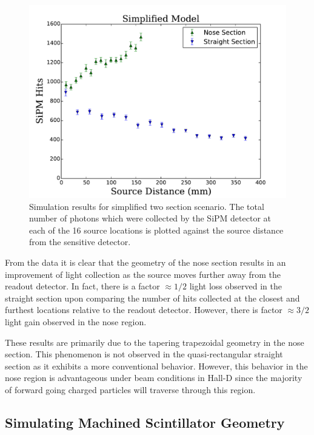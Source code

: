 	\begin{figure}[!htb]
	\centering
	\includegraphics[width=1.0\columnwidth]{simulation/figs/sim_results_v5}
	\caption{Simulation results for simplified two section scenario. The total number of photons which were collected by the SiPM detector at each of the 16 source locations is plotted against the source distance from the sensitive detector.}
	\label{fig:sim_results}
	\end{figure}

From the data it is clear that the geometry of the nose section results in an improvement of light collection as the source moves further away from the readout detector.  In fact, there is a factor $\approx 1/2$ light loss observed in the straight section upon comparing the number of hits collected at the closest and furthest locations relative to the readout detector.  However, there is factor $\approx 3/2$ light gain observed in the nose region.

These results are primarily due to the tapering trapezoidal geometry in the nose section.  This phenomenon is not observed in the quasi-rectangular straight section as it exhibits a more conventional behavior. However, this behavior in the nose region is advantageous under beam conditions in Hall-D since the majority of forward going charged particles will traverse through this region.

\subsection{Simulating Machined Scintillator Geometry} \label{sec:sim_mach}

